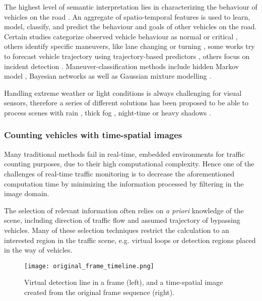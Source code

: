 The highest level of semantic interpretation lies in characterizing the behaviour of vehicles on the road \cite{Sivaraman2013}.
An aggregate of spatio-temporal features is used to learn, model, classify, and predict the behaviour and goals of other vehicles on the road.
Certain studies categorize observed vehicle behaviour as normal or critical \cite{Cherng2009}, others identify specific maneuvers, like lane changing or turning \cite{Garcia2012}, some works try to forecast vehicle trajectory using trajectory-based predictors \cite{Hermes2009}, others focus on incident detection \cite{Kamijo2004}.
Maneuver-classification methods include hidden Markov model \cite{Sivaraman2011}, Bayesian networks \cite{Kasper2012} as well as Gaussian mixture modelling \cite{Wiest2012}.

Handling extreme weather or light conditions is always challenging for visual sensors, therefore a series of different solutions has been proposed to be able to process scenes with rain \cite{Yu2015,Barnum2010}, thick fog \cite{Zhou2014a,Tarel2009}, night-time \cite{Bi2009, Robert2009} or heavy shadows \cite{Kamkar2016, Miller2015}.

\subsubsection{Counting vehicles with time-spatial images}
Many traditional methods fail in real-time, embedded environments for traffic counting purposes, due to their high computational complexity.
Hence one of the challenges of real-time traffic monitoring is to decrease the aforementioned computation time by minimizing the information processed by filtering in the image domain.

The selection of relevant information often relies on \textit{a priori} knowledge of the scene, including direction of traffic flow and assumed trajectory of bypassing vehicles.
Many of these selection techniques restrict the calculation to an interested region in the traffic scene, e.g. virtual loops \cite{Tursun2013a, He2008} or detection regions \cite{Miller2015, Engel2016} placed in the way of vehicles.

\begin{figure}[!h]
	\centering
	\texttt{[image: original\_frame\_timeline.png]}
	\caption[Virtual detection line and time-spatial image]{Virtual detection line in a frame (left), and a time-spatial image created from the original frame sequence (right).\label{fig:TSI}}
\end{figure}

